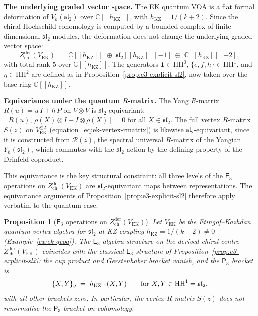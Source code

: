 \documentclass[11pt,reqno]{amsart}
\newtheorem{proposition}[theorem]{Proposition}
\theoremstyle{definition}
\theoremstyle{remark}
\newcommand{\HH}{\mathrm{HH}}
\newcommand{\Ethree}{\mathsf{E}_{3}}
\newcommand{\Pthree}{\mathsf{P}_{3}}
\newcommand{\CC}{\mathbb{C}}
\numberwithin{equation}{section}
\begin{document}
\medskip
\noindent
\textbf{The underlying graded vector space.}
The EK quantum VOA is a flat formal deformation of
$V_k(\mathfrak{sl}_2)$ over $\CC[[h_{\mathrm{KZ}}]]$, with
$h_{\mathrm{KZ}} = 1/(k+2)$.
Since the chiral Hochschild cohomology is computed by
a bounded complex of finite-dimensional
$\mathfrak{sl}_2$-modules, the deformation does not
change the underlying graded vector space:
\begin{equation}\label{eq:ek-e3-graded}
  Z^{\mathrm{der}}_{\mathrm{ch}}(V_{\mathrm{EK}})
  \;=\;
  \CC[[h_{\mathrm{KZ}}]]
  \;\oplus\;
  \mathfrak{sl}_2[[h_{\mathrm{KZ}}]][-1]
  \;\oplus\;
  \CC[[h_{\mathrm{KZ}}]][-2],
\end{equation}
with total rank $5$ over $\CC[[h_{\mathrm{KZ}}]]$.
The generators
$\mathbf{1} \in \HH^0$, $\{e, f, h\} \in \HH^1$, and
$\eta \in \HH^2$ are defined as in
Proposition~\ref{prop:e3-explicit-sl2}, now taken
over the base ring $\CC[[h_{\mathrm{KZ}}]]$.

\medskip
\noindent
\textbf{Equivariance under the quantum $R$-matrix.}
The Yang $R$-matrix $R(u) = u\,I + \hbar\,P$ on
$V \otimes V$ is $\mathfrak{sl}_2$-equivariant:
$[R(u),\, \rho(X) \otimes I + I \otimes \rho(X)] = 0$
for all $X \in \mathfrak{sl}_2$.
The full vertex $R$-matrix
$S(z)$ on $V_{\mathrm{EK}}^{\otimes 2}$
(equation~\eqref{eq:ek-vertex-rmatrix}) is likewise
$\mathfrak{sl}_2$-equivariant, since it is constructed from
$\mathcal{R}(z)$, the spectral universal $R$-matrix of
the Yangian $Y_\hbar(\mathfrak{sl}_2)$, which
commutes with the $\mathfrak{sl}_2$-action by the
defining property of the Drinfeld coproduct.

This equivariance is the key structural constraint: all
three levels of the $\Ethree$ operations on
$Z^{\mathrm{der}}_{\mathrm{ch}}(V_{\mathrm{EK}})$ are
$\mathfrak{sl}_2$-equivariant maps between representations.
The equivariance arguments of
Proposition~\ref{prop:e3-explicit-sl2} therefore apply
verbatim to the quantum case.

\begin{proposition}[{$\Ethree$ operations on
$Z^{\mathrm{der}}_{\mathrm{ch}}(V_{\mathrm{EK}})$}]
\label{prop:e3-ek-quantum}
Let $V_{\mathrm{EK}}$ be the Etingof--Kazhdan quantum
vertex algebra for $\mathfrak{sl}_2$ at KZ coupling
$h_{\mathrm{KZ}} = 1/(k+2) \neq 0$
\textup{(}Example~\textup{\ref{ex:ek-qvoa}}\textup{)}.
The $\Ethree$-algebra structure on the derived chiral
centre $Z^{\mathrm{der}}_{\mathrm{ch}}(V_{\mathrm{EK}})$
coincides with the classical $\Ethree$ structure of
Proposition~\textup{\ref{prop:e3-explicit-sl2}}: the
cup product and Gerstenhaber bracket vanish, and the
$\Pthree$ bracket is
\begin{equation}\label{eq:ek-p3-bracket}
  \{X, Y\}_q \;=\; h_{\mathrm{KZ}} \cdot (X, Y)
  \qquad
  \textup{for } X, Y \in \HH^1 = \mathfrak{sl}_2,
\end{equation}
with all other brackets zero. In particular, the
vertex $R$-matrix $S(z)$ does not renormalise the
$\Pthree$ bracket on cohomology.
\end{proposition}
\end{document}
